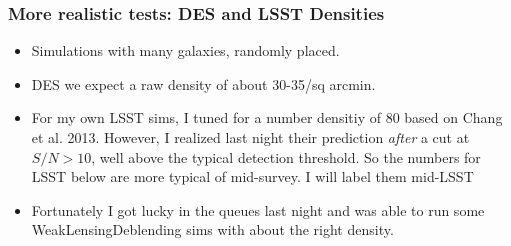 \documentclass{beamer}
\begin{document}
\frame
{
    \frametitle{More realistic tests:  DES and LSST Densities}

 
    \begin{itemize}

        \item Simulations with many galaxies, randomly placed.

        \item DES we expect a raw density of about 30-35/sq arcmin.

        \item For my own LSST sims, I tuned for a number densitiy of 80 based
            on Chang et al. 2013.  However, I realized last night their
            prediction {\em after} a cut at $S/N > 10$, well above the typical
            detection threshold.  So the numbers for LSST below are more
            typical of mid-survey.  I will label them mid-LSST
            
        \item Fortunately I got lucky in the queues last night and was able to
            run some WeakLensingDeblending sims with about the right density.

    \end{itemize}
}
\end{document}
